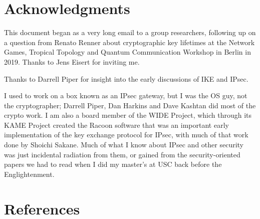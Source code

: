 \documentclass[%
 aip,
 jmp,%
 amsmath,amssymb,
 reprint,%
]{revtex4-1}
\begin{document}
\tableofcontents{}









\section*{Acknowledgments}

This document began as a very long email to a group researchers,
following up on a question from Renato Renner about cryptographic key
lifetimes at the Network Games, Tropical Topology and Quantum
Communication Workshop in Berlin in 2019.  Thanks to Jens Eisert for
inviting me.

Thanks to Darrell Piper for insight into the early discussions of IKE
and IPsec.

I used to work on a box known as an IPsec gateway, but I was the OS
guy, not the cryptographer; Darrell Piper, Dan Harkins and Dave
Kashtan did most of the crypto work.  I am also a board member of the
WIDE Project, which through its KAME Project created the Racoon
software that was an important early implementation of the key
exchange protocol for IPsec, with much of that work done by Shoichi
Sakane.  Much of what I know about IPsec and other security was just
incidental radiation from them, or gained from the security-oriented
papers we had to read when I did my master's at USC back before the
Englightenment.

\section{References}





\appendix
\onecolumngrid





\end{document}
